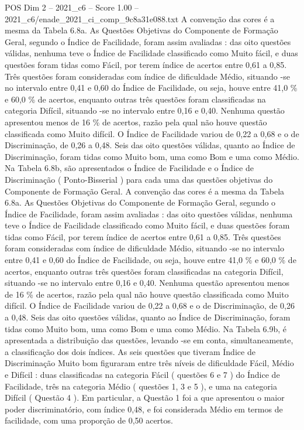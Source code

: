 \begin{textsample}{POS Dim 2 – 2021\_c6 – Score 1.00 – 2021\_c6/enade\_2021\_ci\_comp\_9c8a31e088.txt}
A convenção das cores é a mesma da Tabela 6.8a.
As Questões Objetivas do Componente de Formação Geral, segundo o Índice de Facilidade, foram assim avaliadas : das oito questões válidas, nenhuma teve o Índice de Facilidade classificado como Muito fácil, e duas questões foram tidas como Fácil, por terem índice de acertos entre 0,61 a 0,85.
Três questões foram consideradas com índice de dificuldade Médio, situando -se no intervalo entre 0,41 e 0,60 do Índice de Facilidade, ou seja, houve entre 41,0 \% e 60,0 \% de acertos, enquanto outras três questões foram classificadas na categoria Difícil, situando -se no intervalo entre 0,16 e 0,40.
Nenhuma questão apresentou menos de 16 \% de acertos, razão pela qual não houve questão classificada como Muito difícil.
O Índice de Facilidade variou de 0,22 a 0,68 e o de Discriminação, de 0,26 a 0,48.
Seis das oito questões válidas, quanto ao Índice de Discriminação, foram tidas como Muito bom, uma como Bom e uma como Médio.
Na Tabela 6.8b, são apresentados o Índice de Facilidade e o Índice de Discriminação ( Ponto-Bisserial ) para cada uma das questões objetivas do Componente de Formação Geral.
A convenção das cores é a mesma da Tabela 6.8a.
As Questões Objetivas do Componente de Formação Geral, segundo o Índice de Facilidade, foram assim avaliadas : das oito questões válidas, nenhuma teve o Índice de Facilidade classificado como Muito fácil, e duas questões foram tidas como Fácil, por terem índice de acertos entre 0,61 a 0,85.
Três questões foram consideradas com índice de dificuldade Médio, situando -se no intervalo entre 0,41 e 0,60 do Índice de Facilidade, ou seja, houve entre 41,0 \% e 60,0 \% de acertos, enquanto outras três questões foram classificadas na categoria Difícil, situando -se no intervalo entre 0,16 e 0,40.
Nenhuma questão apresentou menos de 16 \% de acertos, razão pela qual não houve questão classificada como Muito difícil.
O Índice de Facilidade variou de 0,22 a 0,68 e o de Discriminação, de 0,26 a 0,48.
Seis das oito questões válidas, quanto ao Índice de Discriminação, foram tidas como Muito bom, uma como Bom e uma como Médio.
Na Tabela 6.9b, é apresentada a distribuição das questões, levando -se em conta, simultaneamente, a classificação dos dois índices.
As seis questões que tiveram Índice de Discriminação Muito bom figuraram entre três níveis de dificuldade Fácil, Médio e Difícil : duas classificadas na categoria Fácil ( questões 6 e 7 ) do Índice de Facilidade, três na categoria Médio ( questões 1, 3 e 5 ), e uma na categoria Difícil ( Questão 4 ).
Em particular, a Questão 1 foi a que apresentou o maior poder discriminatório, com índice 0,48, e foi considerada Médio em termos de facilidade, com uma proporção de 0,50 acertos.

\end{textsample}
